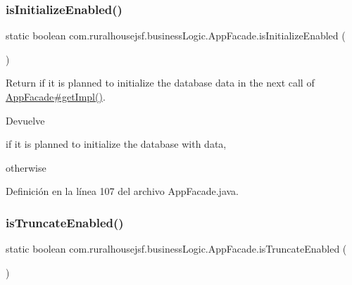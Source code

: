 \subsubsection{\texorpdfstring{isInitializeEnabled()}{isInitializeEnabled()}}
{\footnotesize\ttfamily static boolean com.\+ruralhousejsf.\+business\+Logic.\+App\+Facade.\+is\+Initialize\+Enabled (\begin{DoxyParamCaption}{ }\end{DoxyParamCaption})\hspace{0.3cm}{\ttfamily [static]}}

Return if it is planned to initialize the database data in the next call of \mbox{\hyperlink{classcom_1_1ruralhousejsf_1_1business_logic_1_1_app_facade_a029bcceee98b9070b9f80abc54db45d6}{App\+Facade\#get\+Impl()}}.

\begin{DoxyReturn}{Devuelve}

\begin{DoxyCode}{0}
\DoxyCodeLine{\textcolor{keyword}{true} }
\end{DoxyCode}
 if it is planned to initialize the database with data,
\begin{DoxyCode}{0}
\DoxyCodeLine{\textcolor{keyword}{false} }
\end{DoxyCode}
 otherwise 
\end{DoxyReturn}


Definición en la línea 107 del archivo App\+Facade.\+java.

\mbox{\label{classcom_1_1ruralhousejsf_1_1business_logic_1_1_app_facade_a3638d881ea2d917df632a313d9ed9b20}} 
\subsubsection{\texorpdfstring{isTruncateEnabled()}{isTruncateEnabled()}}
{\footnotesize\ttfamily static boolean com.\+ruralhousejsf.\+business\+Logic.\+App\+Facade.\+is\+Truncate\+Enabled (\begin{DoxyParamCaption}{ }\end{DoxyParamCaption})\hspace{0.3cm}{\ttfamily [static]}}

